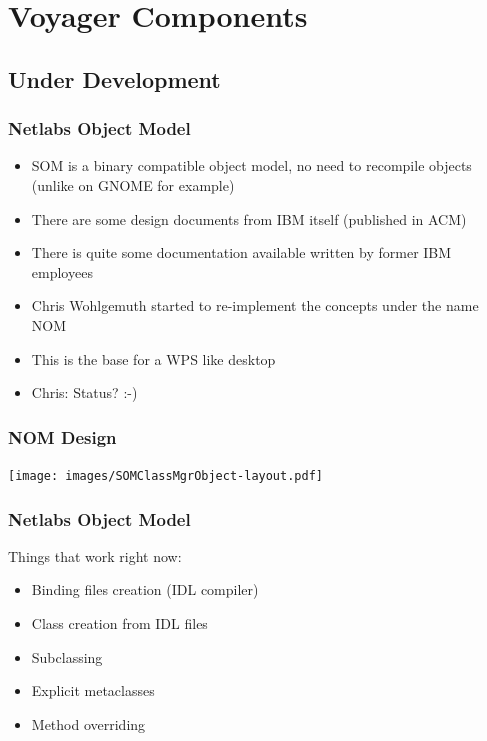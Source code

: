 \documentclass{beamer}
\begin{document}
\section{Voyager Components}
\subsection{Under Development}

\begin{frame}
\frametitle{Netlabs Object Model}
\begin{itemize}[<+->]
  \item SOM is a binary compatible object model, no need to recompile objects (unlike on GNOME for example)
  \item There are some design documents from IBM itself (published in ACM)
  \item There is quite some documentation available written by former IBM employees
  \item Chris Wohlgemuth started to re-implement the concepts under the name NOM
  \item This is the base for a WPS like desktop
  \item Chris: Status? :-)
\end{itemize}
\end{frame}

\begin{frame}
\frametitle{NOM Design}
\texttt{[image: images/SOMClassMgrObject-layout.pdf]}

\end{frame}

\begin{frame}
\frametitle{Netlabs Object Model}
Things that work right now:
\begin{itemize}[<+->]
  \item Binding files creation (IDL compiler)
  \item Class creation from IDL files
  \item Subclassing
  \item Explicit metaclasses
  \item Method overriding
\end{itemize}
\end{frame}
\end{document}
